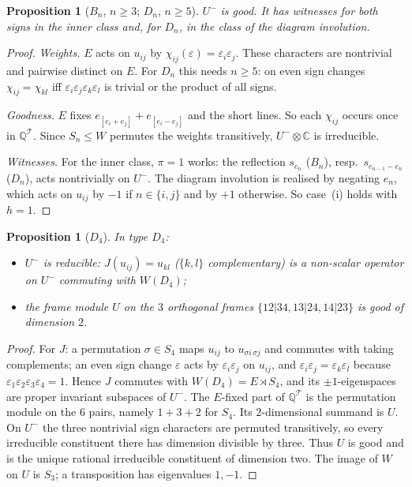 \documentclass[11pt]{amsart}
\newtheorem{proposition}[theorem]{Proposition}
\theoremstyle{definition}
\newcommand{\Q}{\mathbb{Q}}
\newcommand{\C}{\mathbb{C}}
\newcommand{\T}{\mathcal{T}}
\begin{document}
\begin{proposition}[$B_n$, $n\ge3$; $D_n$, $n\ge5$]\label{prop:BD}
$U^-$ is good. It has witnesses for both signs in the inner class and, for $D_n$,
in the class of the diagram involution.
\end{proposition}
\begin{proof}
\emph{Weights.} $E$ acts on $u_{ij}$ by $\chi_{ij}(\varepsilon)=\varepsilon_i\varepsilon_j$. These characters are
nontrivial and pairwise distinct on $E$. For $D_n$ this needs $n\ge5$: on even sign changes $\chi_{ij}=\chi_{kl}$
iff $\varepsilon_i\varepsilon_j\varepsilon_k\varepsilon_l$ is trivial or the product of all signs.

\emph{Goodness.} $E$ fixes $e_{[e_i+e_j]}+e_{[e_i-e_j]}$ and the short lines. So each $\chi_{ij}$ occurs once in
$\Q^\T$. Since $S_n\le W$ permutes the weights transitively, $U^-\otimes\C$ is irreducible.

\emph{Witnesses.} For the inner class, $\pi=1$ works: the reflection
$s_{e_n}$ ($B_n$), resp.\ $s_{e_{n-1}-e_n}$ ($D_n$), acts nontrivially on $U^-$. The diagram involution is realised
by negating $e_n$, which acts on $u_{ij}$ by $-1$ if $n\in\{i,j\}$ and by $+1$ otherwise. So case~(i) holds with
$h=1$.
\end{proof}

\begin{proposition}[$D_4$]\label{prop:D4}
In type $D_4$:
\begin{itemize}
\item $U^-$ is reducible: $J(u_{ij})=u_{kl}$ ($\{k,l\}$ complementary) is a non-scalar operator on $U^-$ commuting with
$W(D_4)$;
\item the frame module $U$ on the $3$ orthogonal frames $\{12|34,13|24,14|23\}$ is good of dimension $2$.
\end{itemize}
\end{proposition}
\begin{proof}
For $J$: a permutation $\sigma\in S_4$ maps $u_{ij}$ to $u_{\sigma i\,\sigma j}$ and commutes with taking complements; an
even sign change $\varepsilon$ acts by $\varepsilon_i\varepsilon_j$ on $u_{ij}$, and
$\varepsilon_i\varepsilon_j=\varepsilon_k\varepsilon_l$ because $\varepsilon_1\varepsilon_2\varepsilon_3\varepsilon_4=1$. Hence
$J$ commutes with $W(D_4)=E\rtimes S_4$, and its $\pm1$-eigenspaces are proper invariant subspaces of $U^-$.
The $E$-fixed part of $\Q^\T$ is the permutation module on the $6$ pairs, namely $1+3+2$ for $S_4$. Its
$2$-dimensional summand is $U$. On $U^-$ the three nontrivial sign characters are permuted transitively,
so every irreducible constituent there has dimension divisible by three. Thus $U$ is good and is the
unique rational irreducible constituent of dimension two. The image of $W$ on $U$ is $S_3$;
a transposition has eigenvalues $1,-1$.
\end{proof}
\end{document}

